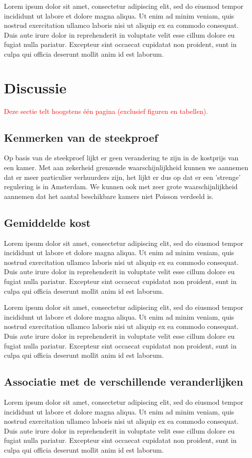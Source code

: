 \documentclass[a4paper]{kulakarticle}
\newcommand{\rood}[1]{\textcolor{red}{#1}}
\begin{document}
	Lorem ipsum dolor sit amet, consectetur adipiscing elit, sed do eiusmod tempor incididunt ut labore et dolore magna aliqua. Ut enim ad minim veniam, quis nostrud exercitation ullamco laboris nisi ut aliquip ex ea commodo consequat. Duis aute irure dolor in reprehenderit in voluptate velit esse cillum dolore eu fugiat nulla pariatur. Excepteur sint occaecat cupidatat non proident, sunt in culpa qui officia deserunt mollit anim id est laborum.
	
	\section{Discussie}
	\rood{Deze sectie telt hoogstens één pagina (exclusief figuren en tabellen).}
	\subsection{Kenmerken van de steekproef}
Op basis van de steekproef lijkt er geen verandering te zijn in de kostprijs van een kamer. Met aan zekerheid grenzende waarschijnlijkheid kunnen we aannemen dat er meer particulier verhuurders zijn, het lijkt er dus op dat er een 'strenge' regulering is in Amsterdam. We kunnen ook met zeer grote waarschijnlijkheid aannemen dat het aantal beschikbare kamers niet Poisson verdeeld is.
	
	\subsection{Gemiddelde kost}
	Lorem ipsum dolor sit amet, consectetur adipiscing elit, sed do eiusmod tempor incididunt ut labore et dolore magna aliqua. Ut enim ad minim veniam, quis nostrud exercitation ullamco laboris nisi ut aliquip ex ea commodo consequat. Duis aute irure dolor in reprehenderit in voluptate velit esse cillum dolore eu fugiat nulla pariatur. Excepteur sint occaecat cupidatat non proident, sunt in culpa qui officia deserunt mollit anim id est laborum.
	
	Lorem ipsum dolor sit amet, consectetur adipiscing elit, sed do eiusmod tempor incididunt ut labore et dolore magna aliqua. Ut enim ad minim veniam, quis nostrud exercitation ullamco laboris nisi ut aliquip ex ea commodo consequat. Duis aute irure dolor in reprehenderit in voluptate velit esse cillum dolore eu fugiat nulla pariatur. Excepteur sint occaecat cupidatat non proident, sunt in culpa qui officia deserunt mollit anim id est laborum.
	
	\subsection{Associatie met de verschillende veranderlijken}
	Lorem ipsum dolor sit amet, consectetur adipiscing elit, sed do eiusmod tempor incididunt ut labore et dolore magna aliqua. Ut enim ad minim veniam, quis nostrud exercitation ullamco laboris nisi ut aliquip ex ea commodo consequat. Duis aute irure dolor in reprehenderit in voluptate velit esse cillum dolore eu fugiat nulla pariatur. Excepteur sint occaecat cupidatat non proident, sunt in culpa qui officia deserunt mollit anim id est laborum.
	
\end{document}
